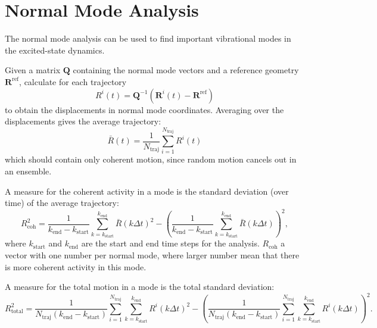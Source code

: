 \documentclass[a4paper,10pt,DIV=15,openany]{scrbook}
\newcommand{\VEC}[1]{\ensuremath{\mathbf{#1}}}
\begin{document}

\section{Normal Mode Analysis}\label{met:nma}

The normal mode analysis can be used to find important vibrational modes in the excited-state dynamics.\cite{Kurtz2001JCP,Plasser2009}

Given a matrix $\VEC{Q}$ containing the normal mode vectors and a reference geometry $\VEC{R}^\text{ref}$, calculate for each trajectory
\begin{equation}
  R^i(t)=\VEC{Q}^{-1}(\VEC{R}^i(t)-\VEC{R}^\text{ref})
\end{equation}
to obtain the displacements in normal mode coordinates.
Averaging over the displacements gives the average trajectory:
\begin{equation}
  \bar{R}(t)=\frac{1}{N_\text{traj}}
  \sum_{i=1}^{N_\text{traj}} R^i(t)
\end{equation}
which should contain only coherent motion, since random motion cancels out in an ensemble.

A measure for the coherent activity in a mode is the standard deviation (over time) of the average trajectory:
\begin{equation}
  R_\text{coh}^2=
  \frac{1}{k_\text{end}-k_\text{start}}
  \sum_{k=k_\text{start}}^{k_\text{end}} \bar{R}(k\Delta t)^2
  -
  \left(
  \frac{1}{k_\text{end}-k_\text{start}}
  \sum_{k=k_\text{start}}^{k_\text{end}} \bar{R}(k\Delta t)
  \right)^2,
\end{equation}
where $k_\text{start}$ and $k_\text{end}$ are the start and end time steps for the analysis.
$R_\text{coh}$ a vector with one number per normal mode, where larger number mean that there is more coherent activity in this mode.

A measure for the total motion in a mode is the total standard deviation:
\begin{equation}
  R_\text{total}^2=
  \frac{1}{N_\text{traj}(k_\text{end}-k_\text{start})}
  \sum_{i=1}^{N_\text{traj}}
  \sum_{k=k_\text{start}}^{k_\text{end}} 
  R^i(k\Delta t)^2
  -
  \left(
  \frac{1}{N_\text{traj}(k_\text{end}-k_\text{start})}
  \sum_{i=1}^{N_\text{traj}}
  \sum_{k=k_\text{start}}^{k_\text{end}} 
  R^i(k\Delta t)
  \right)^2.
\end{equation}
\end{document}
